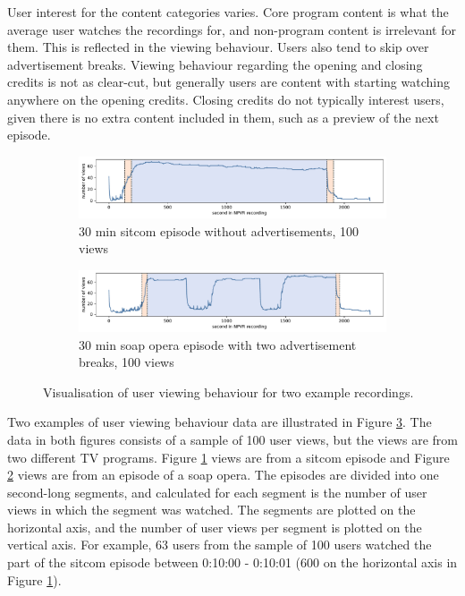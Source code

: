 User interest for the content categories varies. Core program content is what the average user watches the recordings for, and non-program content is irrelevant for them. This is reflected in the viewing behaviour. Users also tend to skip over advertisement breaks. Viewing behaviour regarding the opening and closing credits is not as clear-cut, but generally users are content with starting watching anywhere on the opening credits. Closing credits do not typically interest users, given there is no extra content included in them, such as a preview of the next episode. 

\begin{figure}[H]
    \centering
    \begin{subfigure}[b]{\textwidth}
       \includegraphics[width=1\textwidth]{../plots/sitcom.pdf}
       \caption{30 min sitcom episode without advertisements, 100 views}
       \label{fig:sitcom_viewing_behaviour} 
    \end{subfigure}
    \par\bigskip
    \begin{subfigure}[b]{\textwidth}
       \includegraphics[width=1\textwidth]{../plots/soap_opera.pdf}
       \caption{30 min soap opera episode with two advertisement breaks, 100 views}
       \label{fig:soap_opera_viewing_behaviour}
    \end{subfigure}
    \caption{Visualisation of user viewing behaviour for two example recordings.}
    \label{fig:user_viewing_behaviour}
\end{figure}

Two examples of user viewing behaviour data are illustrated in Figure \ref{fig:user_viewing_behaviour}. The data in both figures consists of a sample of 100 user views, but the views are from two different TV programs. Figure \ref{fig:sitcom_viewing_behaviour} views are from a sitcom episode and Figure \ref{fig:soap_opera_viewing_behaviour} views are from an episode of a soap opera. The episodes are divided into one second-long segments, and calculated for each segment is the number of user views in which the segment was watched. The segments are plotted on the horizontal axis, and the number of user views per segment is plotted on the vertical axis. For example, 63 users from the sample of 100 users watched the part of the sitcom episode between 0:10:00 - 0:10:01 (600 on the horizontal axis in Figure \ref{fig:sitcom_viewing_behaviour}).

